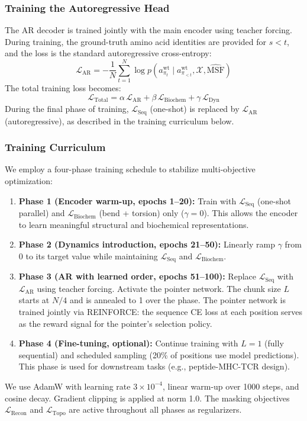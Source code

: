 \documentclass{article}
\begin{document}
\subsubsection{Training the Autoregressive Head}
The AR decoder is trained jointly with the main encoder using teacher forcing. During training, the ground-truth amino acid identities are provided for $s < t$, and the loss is the standard autoregressive cross-entropy:
\begin{equation}
    \mathcal{L}_{\text{AR}} = -\frac{1}{N} \sum_{t=1}^{N} \log p(a_{\pi_t}^{\text{wt}} \mid a_{\pi_{<t}}^{\text{wt}}, \mathcal{X}, \widehat{\text{MSF}})
\end{equation}
The total training loss becomes:
\begin{equation}
    \mathcal{L}_{\text{Total}} = \alpha \, \mathcal{L}_{\text{AR}} + \beta \, \mathcal{L}_{\text{Biochem}} + \gamma \, \mathcal{L}_{\text{Dyn}}
\end{equation}
During the final phase of training, $\mathcal{L}_{\text{Seq}}$ (one-shot) is replaced by $\mathcal{L}_{\text{AR}}$ (autoregressive), as described in the training curriculum below.

\subsubsection{Training Curriculum}
\label{sec:curriculum}
We employ a four-phase training schedule to stabilize multi-objective optimization:
\begin{enumerate}
    \item \textbf{Phase 1 (Encoder warm-up, epochs 1--20):} Train with $\mathcal{L}_{\text{Seq}}$ (one-shot parallel) and $\mathcal{L}_{\text{Biochem}}$ (bend + torsion) only ($\gamma = 0$). This allows the encoder to learn meaningful structural and biochemical representations.
    \item \textbf{Phase 2 (Dynamics introduction, epochs 21--50):} Linearly ramp $\gamma$ from 0 to its target value while maintaining $\mathcal{L}_{\text{Seq}}$ and $\mathcal{L}_{\text{Biochem}}$.
    \item \textbf{Phase 3 (AR with learned order, epochs 51--100):} Replace $\mathcal{L}_{\text{Seq}}$ with $\mathcal{L}_{\text{AR}}$ using teacher forcing. Activate the pointer network. The chunk size $L$ starts at $N/4$ and is annealed to 1 over the phase. The pointer network is trained jointly via REINFORCE: the sequence CE loss at each position serves as the reward signal for the pointer's selection policy.
    \item \textbf{Phase 4 (Fine-tuning, optional):} Continue training with $L=1$ (fully sequential) and scheduled sampling (20\% of positions use model predictions). This phase is used for downstream tasks (e.g., peptide-MHC-TCR design).
\end{enumerate}
We use AdamW with learning rate $3 \times 10^{-4}$, linear warm-up over 1000 steps, and cosine decay. Gradient clipping is applied at norm 1.0. The masking objectives $\mathcal{L}_{\text{Recon}}$ and $\mathcal{L}_{\text{Topo}}$ are active throughout all phases as regularizers.
\end{document}
